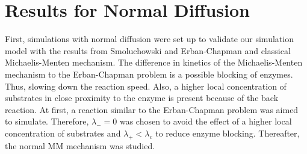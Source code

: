 \documentclass[
  a4paper,BCOR10mm,twoside,
  headsepline,footsepline,%
  fleqn,openbib
]{scrbook}
\begin{document}
\section{Results for Normal Diffusion}
First, simulations with normal diffusion were set up to validate our simulation model  with the results from Smoluchowski \cite{vonSmoluchowski1906} and Erban-Chapman \cite{Erban2009} and classical Michaelis-Menten mechanism. The difference in kinetics of the Michaelis-Menten mechanism to the Erban-Chapman problem is a possible blocking of enzymes. Thus, slowing down the reaction speed. Also, a higher local concentration of substrates in close proximity to the enzyme is present because of the back reaction. At first, a reaction similar to the Erban-Chapman problem was aimed to simulate. Therefore,  $\lambda_-=0 $  was chosen to avoid the effect of a higher local concentration of substrates and $\lambda_+ < \lambda_c$ to reduce enzyme blocking. Thereafter, the normal MM mechanism was studied. 
\end{document}
